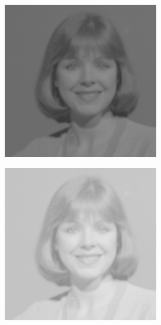 \documentclass{article}
\begin{document}
\begin{figure}[h]
\begin{subfigure}{.3\textwidth}
  \centering
  \includegraphics[width=0.97\linewidth]{_Figures/sample_4.png}
  \caption{}
   \label{fig:brigth_raw_4}
\end{subfigure}%
\begin{subfigure}{.3\textwidth}
  \centering
  \includegraphics[width=0.97\linewidth]{_Figures/sample_4_brigthness_low.png}

\end{subfigure}
\end{figure}
\end{document}
